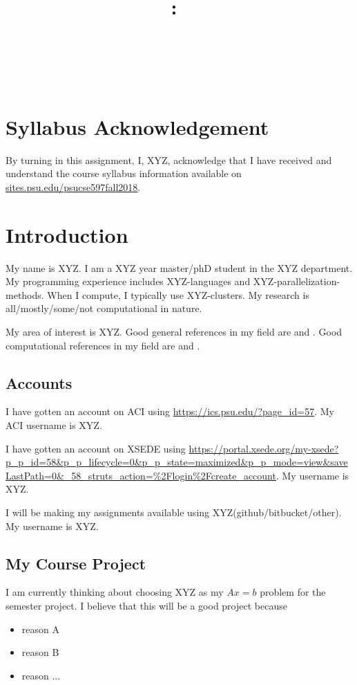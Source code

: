 \documentclass{article}
\title{\vspace{2in}\textmd{\textbf{\hmwkClass:\ \hmwkTitle}}\\\normalsize\vspace{0.1in}\small{\hmwkDueDate}\\\vspace{0.1in}\large{\textit{\hmwkClassInstructor\ \hmwkClassTime}}\vspace{3in}}
\date{}
\author{\textbf{\hmwkAuthorNameb} } %
\begin{document}
\begin{spacing}{1.1}
\maketitle

\newpage
\section{Syllabus Acknowledgement}

By turning in this assignment, I, XYZ, acknowledge that I have received and understand the course syllabus information available on \url{sites.psu.edu/psucse597fall2018}. 

\section{Introduction}

My name is XYZ.  I am a XYZ year master/phD student in the XYZ department. My programming experience includes XYZ-languages and XYZ-parallelization-methods.  When I compute, I typically use XYZ-clusters.  My research is all/mostly/some/not computational in nature. 

My area of interest is XYZ. Good general references in my field are \citet{wilcox2000basic} and \citet{kreyszig2010advanced}.  Good computational references in my field are \citet{anderson1995computational} and \citet{wilcox1998turbulence}. 


\subsection{Accounts}

I have gotten an account on ACI using \url{https://ics.psu.edu/?page_id=57}.  My ACI username is XYZ.

I have gotten an account on XSEDE using \url{https://portal.xsede.org/my-xsede?p_p_id=58&p_p_lifecycle=0&p_p_state=maximized&p_p_mode=view&saveLastPath=0&_58_struts_action=%2Flogin%2Fcreate_account}.  My username is XYZ.

I will be making my assignments available using XYZ(github/bitbucket/other). My username is XYZ. 

\subsection{My Course Project}

I am currently thinking about choosing XYZ as my $Ax=b$ problem for the semester project. I believe that this will be a good project because
\begin{itemize}
  \item reason A
  \item reason B
  \item reason ...
\end{itemize}



\end{spacing}
\end{document}

